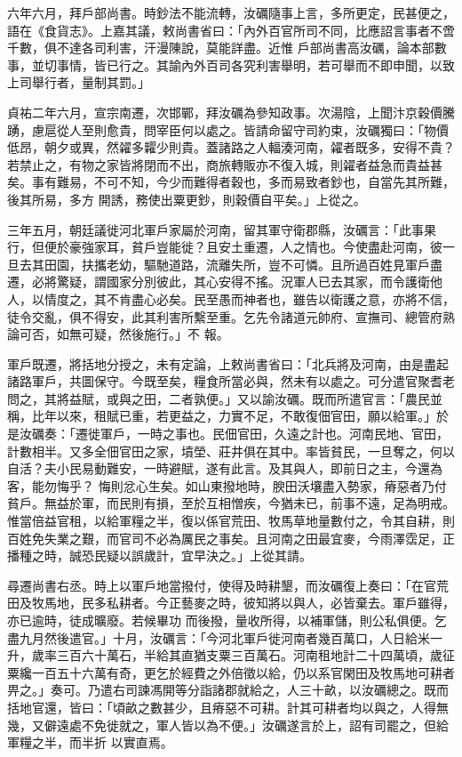 \begin{pinyinscope}
 六年六月，拜戶部尚書。時鈔法不能流轉，汝礪隨事上言，多所更定，民甚便之，語在《食貨志》。上嘉其議，敕尚書省曰：「內外百官所司不同，比應詔言事者不啻千數，俱不達各司利害，汗漫陳說，莫能詳盡。近惟
 戶部尚書高汝礪，論本部數事，並切事情，皆已行之。其諭內外百司各究利害舉明，若可舉而不即申聞，以致上司舉行者，量制其罰。」



 貞祐二年六月，宣宗南遷，次邯鄲，拜汝礪為參知政事。次湯陰，上聞汴京穀價騰踴，慮扈從人至則愈貴，問宰臣何以處之。皆請命留守司約束，汝礪獨曰：「物價低昂，朝夕或異，然糴多糶少則貴。蓋諸路之人輻湊河南，糴者既多，安得不貴？若禁止之，有物之家皆將閉而不出，商旅轉販亦不復入城，則糴者益急而貴益甚矣。事有難易，不可不知，今少而難得者穀也，多而易致者鈔也，自當先其所難，後其所易，多方
 開誘，務使出粟更鈔，則穀價自平矣。」上從之。



 三年五月，朝廷議徙河北軍戶家屬於河南，留其軍守衛郡縣，汝礪言：「此事果行，但便於豪強家耳，貧戶豈能徙？且安土重遷，人之情也。今使盡赴河南，彼一旦去其田園，扶攜老幼，驅馳道路，流離失所，豈不可憐。且所過百姓見軍戶盡遷，必將驚疑，謂國家分別彼此，其心安得不搖。況軍人已去其家，而令護衛他人，以情度之，其不肯盡心必矣。民至愚而神者也，雖告以衛護之意，亦將不信，徒令交亂，俱不得安，此其利害所繫至重。乞先令諸道元帥府、宣撫司、總管府熟論可否，如無可疑，然後施行。」不
 報。



 軍戶既遷，將括地分授之，未有定論，上敕尚書省曰：「北兵將及河南，由是盡起諸路軍戶，共圖保守。今既至矣，糧食所當必與，然未有以處之。可分遣官聚耆老問之，其將益賦，或與之田，二者孰便。」又以諭汝礪。既而所遣官言：「農民並稱，比年以來，租賦已重，若更益之，力實不足，不敢復佃官田，願以給軍。」於是汝礪奏：「遷徙軍戶，一時之事也。民佃官田，久遠之計也。河南民地、官田，計數相半。又多全佃官田之家，墳塋、莊井俱在其中。率皆貧民，一旦奪之，何以自活？夫小民易動難安，一時避賦，遂有此言。及其與人，即前日之主，今還為客，能勿悔乎？
 悔則忿心生矣。如山東撥地時，腴田沃壤盡入勢家，瘠惡者乃付貧戶。無益於軍，而民則有損，至於互相憎疾，今猶未已，前事不遠，足為明戒。惟當倍益官租，以給軍糧之半，復以係官荒田、牧馬草地量數付之，令其自耕，則百姓免失業之艱，而官司不必為厲民之事矣。且河南之田最宜麥，今雨澤霑足，正播種之時，誠恐民疑以誤歲計，宜早決之。」上從其請。



 尋遷尚書右丞。時上以軍戶地當撥付，使得及時耕墾，而汝礪復上奏曰：「在官荒田及牧馬地，民多私耕者。今正藝麥之時，彼知將以與人，必皆棄去。軍戶雖得，亦已逾時，徒成曠廢。若候畢功
 而後撥，量收所得，以補軍儲，則公私俱便。乞盡九月然後遣官。」十月，汝礪言：「今河北軍戶徙河南者幾百萬口，人日給米一升，歲率三百六十萬石，半給其直猶支粟三百萬石。河南租地計二十四萬頃，歲征粟纔一百五十六萬有奇，更乞於經費之外倍徵以給，仍以系官閑田及牧馬地可耕者畀之。」奏可。乃遣右司諫馮開等分詣諸郡就給之，人三十畝，以汝礪總之。既而括地官還，皆曰：「頃畝之數甚少，且瘠惡不可耕。計其可耕者均以與之，人得無幾，又僻遠處不免徙就之，軍人皆以為不便。」汝礪遂言於上，詔有司罷之，但給軍糧之半，而半折
 以實直焉。




\end{pinyinscope}

